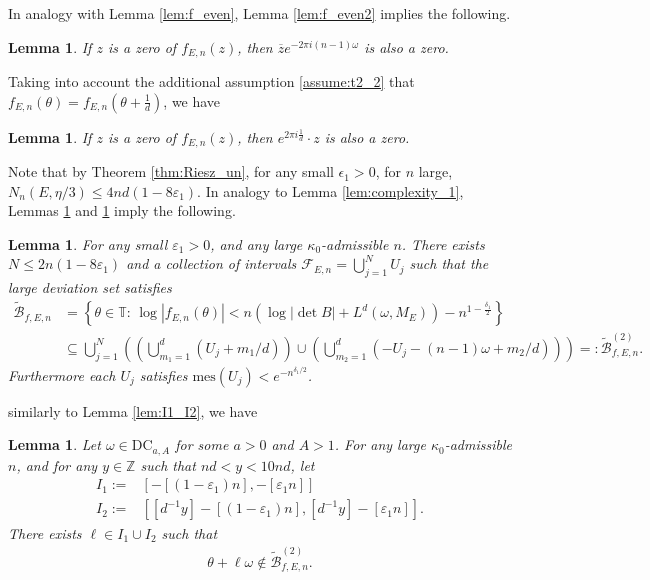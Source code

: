 \documentclass[11pt]{amsart}
\newtheorem{lemma}[theorem]{Lemma}
\newcommand{\Z}{\mathbb Z}
\newcommand{\T}{\mathbb T}
\begin{document}
In analogy with Lemma \ref{lem:f_even}, Lemma \ref{lem:f_even2} implies the following.
\begin{lemma}\label{lem:even_zero_2}
If $z$ is a zero of $f_{E,n}(z)$, then $\overline{z}e^{-2\pi i (n-1)\omega}$ is also a zero.
\end{lemma}


Taking into account the additional assumption \eqref{assume:t2_2} that $f_{E,n}(\theta)=f_{E,n}(\theta+\frac{1}{d})$, we have
\begin{lemma}\label{lem:f_symmetry}
If $z$ is a zero of $f_{E,n}(z)$, then $e^{2\pi i\frac{1}{d}}\cdot z$ is also a zero.
\end{lemma}
Note that by Theorem \ref{thm:Riesz_un}, for any small $\epsilon_1>0$, for $n$ large, $N_n(E,\eta/3)\leq 4nd(1-8\varepsilon_1)$.
In analogy  to Lemma \ref{lem:complexity_1}, Lemmas \ref{lem:even_zero_2} and \ref{lem:f_symmetry} imply the following.
\begin{lemma}\label{lem:complexity_2}
For any small $\varepsilon_1>0$, and any large $\kappa_0$-admissible $n$.
There exists $N\leq 2n(1-8\varepsilon_1)$ and a collection of intervals $\mathcal{F}_{E,n}=\bigcup_{j=1}^N U_j$ such that
the large deviation set satisfies 
\begin{align}\label{def:BfEn^(2)}
\widetilde{\mathcal{B}}_{f,E,n}&=\left\{\theta\in \T:\, \log |f_{E,n}(\theta)|<n(\log |\det B|+L^d(\omega,M_E))-n^{1-\frac{\delta_1}{2}}\right\}\\
&\subseteq \bigcup_{j=1}^N \left(\left(\bigcup_{m_1=1}^d (U_j+m_1/d)\right)\cup \left(\bigcup_{m_2=1}^d (-U_j-(n-1)\omega+m_2/d)\right)\right)=:\widetilde{\mathcal{B}}_{f,E,n}^{(2)}.
\end{align}
Furthermore each $U_j$ satisfies $\mathrm{mes}(U_j)<e^{-n^{\delta_1/2}}$.
\end{lemma}
similarly to Lemma \ref{lem:I1_I2}, we have
\begin{lemma}\label{lem:I1_I2_2}
    Let $\omega\in \mathrm{DC}_{a,A}$ for some $a>0$ and $A>1$. For any large $\kappa_0$-admissible $n$, and for any $y\in \Z$ such that $nd<y<10nd$, let
    \begin{align}
        I_1:=&[-[(1-\varepsilon_1)n], -[\varepsilon_1 n]]\\
        I_2:=&[[d^{-1}y]-[(1-\varepsilon_1)n], [d^{-1}y]-[\varepsilon_1 n]].
    \end{align}
    There exists $\ell\in I_1\cup I_2$ such that
    \begin{align}
        \theta+\ell \omega\notin \widetilde{\mathcal{B}}_{f,E,n}^{(2)}.
    \end{align}
\end{lemma}
\end{document}
